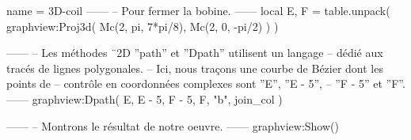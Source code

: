 \documentclass[varwidth, border = 3pt]{standalone}
\begin{document}
\begin{luadraw*}{name = 3D-coil}
------
-- Pour fermer la bobine.
------
local E, F = table.unpack(
  graphview:Proj3d({
    Mc(2, pi, 7*pi/8),
    Mc(2, 0, -pi/2)
  })
)

------
-- Les méthodes ¨2D ''path'' et ''Dpath'' utilisent un langage
-- dédié aux tracés de lignes polygonales.
-- Ici, nous traçons une courbe de Bézier dont les points de
-- contrôle en coordonnées complexes sont ''E'', ''E - 5'',
-- ''F - 5'' et ''F''.
------
graphview:Dpath(
  {E, E - 5, F - 5, F, "b"},
  join_col
)

------
-- Montrons le résultat de notre oeuvre.
------
graphview:Show()
\end{luadraw*}
\end{document}
